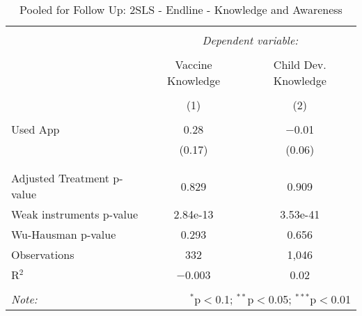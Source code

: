 
\begin{table}[!htbp] \centering 
  \caption{Pooled for Follow Up: 2SLS - Endline - Knowledge and Awareness} 
  \label{tbl:Pooled for Follow Up: 2SLS - Endline - Knowledge and Awareness} 
\begin{tabular}{@{\extracolsep{5pt}}lcc} 
\\[-1.8ex]\hline 
\hline \\[-1.8ex] 
 & \multicolumn{2}{c}{\textit{Dependent variable:}} \\ 
\cline{2-3} 
\\[-1.8ex] & Vaccine Knowledge & Child Dev. Knowledge \\ 
\\[-1.8ex] & (1) & (2)\\ 
\hline \\[-1.8ex] 
 Used App & 0.28 & $-$0.01 \\ 
  & (0.17) & (0.06) \\ 
  & & \\ 
\hline \\[-1.8ex] 
Adjusted Treatment p-value & 0.829 & 0.909 \\ 
Weak instruments p-value & 2.84e-13 & 3.53e-41 \\ 
Wu-Hausman p-value & 0.293 & 0.656 \\ 
Observations & 332 & 1,046 \\ 
R$^{2}$ & $-$0.003 & 0.02 \\ 
\hline 
\hline \\[-1.8ex] 
\textit{Note:}  & \multicolumn{2}{r}{$^{*}$p$<$0.1; $^{**}$p$<$0.05; $^{***}$p$<$0.01} \\ 
\end{tabular} 
\end{table} 

